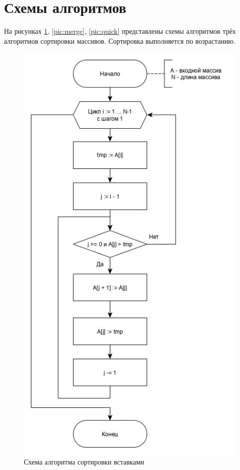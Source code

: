 \documentclass[12pt, a4paper]{report}
\begin{document}
	\section{Схемы алгоритмов}
	На рисунках \ref{pic:insert}, \ref{pic:merge}, \ref{pic:quick} представлены схемы алгоритмов трёх алгоритмов сортировки массивов. Сортировка выполняется по возрастанию.
	\begin{figure}[ht!]
		\centering
		\includegraphics[scale=0.55]{insert.png}
		\caption{Схема алгоритма сортировки вставками}
		\label{pic:insert}
	\end{figure}
	\newpage
\end{document}
